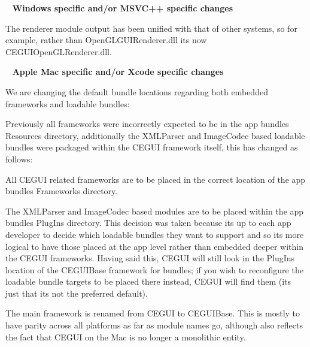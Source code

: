 ~\newline
 {\bfseries{Windows specific and/or M\+S\+V\+C++ specific changes}}
\begin{DoxyItemize}
\item The renderer module output has been unified with that of other systems, so for example, rather than {\ttfamily Open\+G\+L\+G\+U\+I\+Renderer.\+dll} it\textquotesingle{}s now {\ttfamily C\+E\+G\+U\+I\+Open\+G\+L\+Renderer.\+dll}.
\end{DoxyItemize}

~\newline
 {\bfseries{Apple Mac specific and/or Xcode specific changes}}
\begin{DoxyItemize}
\item We are changing the default bundle locations regarding both embedded frameworks and loadable bundles\+:
\begin{DoxyItemize}
\item Previously all frameworks were incorrectly expected to be in the app bundle\textquotesingle{}s {\ttfamily Resources} directory, additionally the X\+M\+L\+Parser and Image\+Codec based loadable bundles were packaged within the C\+E\+G\+UI framework itself, this has changed as follows\+:
\begin{DoxyItemize}
\item All C\+E\+G\+UI related frameworks are to be placed in the correct location of the app bundle\textquotesingle{}s {\ttfamily Frameworks} directory.
\item The X\+M\+L\+Parser and Image\+Codec based modules are to be placed within the app bundle\textquotesingle{}s {\ttfamily Plug\+Ins} directory. This decision was taken because it\textquotesingle{}s up to each app developer to decide which loadable bundles they want to support and so it\textquotesingle{}s more logical to have those placed at the app level rather than embedded deeper within the C\+E\+G\+UI frameworks. Having said this, C\+E\+G\+UI will still look in the {\ttfamily Plug\+Ins} location of the C\+E\+G\+U\+I\+Base framework for bundles; if you wish to reconfigure the loadable bundle targets to be placed there instead, C\+E\+G\+UI will find them (it\textquotesingle{}s just that it\textquotesingle{}s not the preferred default).
\end{DoxyItemize}
\end{DoxyItemize}
\item The main framework is renamed from {\ttfamily C\+E\+G\+UI} to {\ttfamily C\+E\+G\+U\+I\+Base}. This is mostly to have parity across all platforms as far as module names go, although also reflects the fact that \textquotesingle{}C\+E\+G\+UI\textquotesingle{} on the Mac is no longer a monolithic entity.
\end{DoxyItemize}


